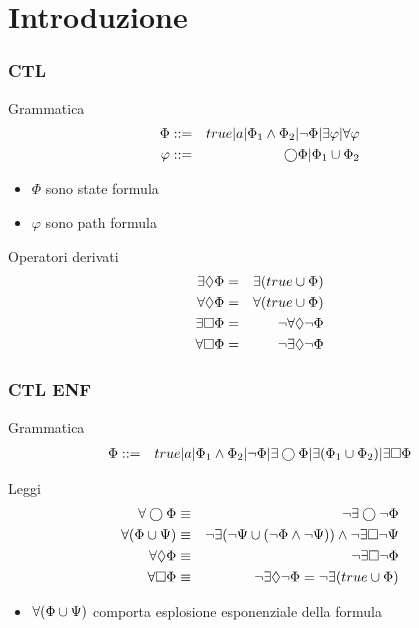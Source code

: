 \section{Introduzione}
\begin{frame}
  \frametitle{\ac{CTL}}
  \begin{block}{Grammatica}
   \begin{eqnarray*}
     \Phi &::=& true|a|\Phi_1\land
     \Phi_2|\neg\Phi|\exists\varphi|\forall\varphi\\
     \varphi &::=& \bigcirc\Phi|\Phi_1\cup\Phi_2
   \end{eqnarray*}
  \end{block}
  \begin{itemize}
  \item $\Phi$ sono state formula
  \item $\varphi$ sono path formula
  \end{itemize}
  \begin{block}{Operatori derivati}
    \begin{eqnarray*}
      \exists\Diamond\Phi &=& \exists(true\cup\Phi)\\
      \forall\Diamond\Phi &=& \forall(true\cup\Phi)\\
      \exists\Box\Phi &=& \neg\forall\Diamond\neg\Phi\\
      \forall\Box\Phi &=& \neg\exists\Diamond\neg\Phi
    \end{eqnarray*}
  \end{block}
\end{frame}

\begin{frame}
  \frametitle{\ac{CTL} \ac{ENF}}
  \begin{block}{Grammatica}
   \begin{eqnarray*}
     \Phi &::=& true|a|\Phi_1\land
     \Phi_2|\neg\Phi|\exists\bigcirc\Phi|\exists(\Phi_1\cup\Phi_2)|
     \exists\Box\Phi
   \end{eqnarray*}
  \end{block}
  \begin{block}{Leggi}
    \begin{eqnarray*}
      \forall\bigcirc\Phi&\equiv&\neg\exists\bigcirc\neg\Phi\\
      \forall(\Phi\cup\Psi)&\equiv&\neg\exists(\neg\Psi\cup(\neg\Phi\land\neg\Psi))\land\neg\exists\Box\neg\Psi\\
      \forall\Diamond\Phi&\equiv&\neg\exists\Box\neg\Phi\\
      \forall\Box\Phi&\equiv&\neg\exists\Diamond\neg\Phi=\neg\exists(true\cup\Phi)
    \end{eqnarray*}
  \end{block}
  \begin{itemize}
  \item $\forall(\Phi\cup\Psi)$ comporta esplosione esponenziale
    della formula
  \end{itemize}
\end{frame}

